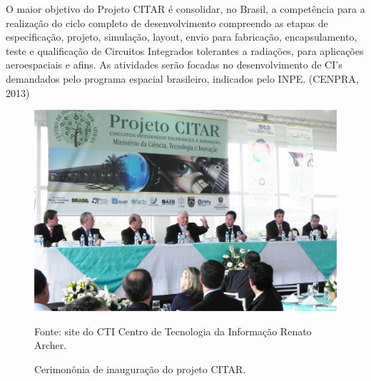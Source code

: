 \documentclass[
	12pt,				%
	openright,			%
	twoside,			%
	a4paper,			%
	english,			%
	french,				%
	spanish,			%
	brazil				%
	]{abntex2}
\begin{document}
O maior objetivo do Projeto CITAR é consolidar, no Brasil, a competência para a realização do ciclo completo de desenvolvimento compreendo as etapas de especificação, projeto, simulação, layout, envio para fabricação, encapsulamento, teste e qualificação de Circuitos Integrados tolerantes a radiações, para aplicações aeroespaciais e afins. As atividades serão focadas no desenvolvimento de CI's demandados pelo programa espacial brasileiro, indicados pelo INPE. (\uppercase{Cenpra}, 2013)\let\thefootnote\relax{}



\vfill
\begin{figure}[!htb]
	\centering
	\caption{Cerimonônia de inauguração do projeto CITAR.}
	\includegraphics[scale = 0.5]{imagens/inauguracaoCTI.jpg}
	
	Fonte: site do CTI Centro de Tecnologia da Informação Renato Archer.\footnotemark[1]
	
	\label{Cerimonia}
\end{figure}
\vfill

\let\thefootnote\relax{}






\end{document}
